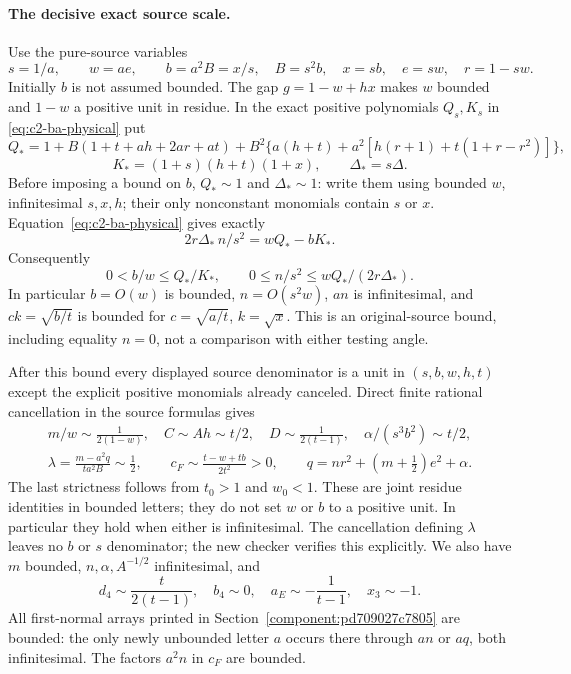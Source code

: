 \paragraph{The decisive exact source scale.}
Use the pure-source variables
\[
 s=1/a,\qquad w=ae,\qquad b=a^2B=x/s,
 \quad B=s^2b,\quad x=sb,\quad e=sw,\quad r=1-sw.
\]
Initially $b$ is not assumed bounded. The gap $g=1-w+hx$ makes $w$
bounded and $1-w$ a positive unit in residue. In the exact positive
polynomials $Q_s,K_s$ in \eqref{eq:c2-ba-physical} put
\[
 Q_*=1+B(1+t+ah+2ar+at)
 +B^2\{a(h+t)+a^2[h(r+1)+t(1+r-r^2)]\},
\]
\[
 K_*=(1+s)(h+t)(1+x),\qquad \Delta_*=s\Delta.
\]
Before imposing a bound on $b$, $Q_*\sim1$ and $\Delta_*\sim1$:
write them using bounded $w$, infinitesimal $s,x,h$; their only
nonconstant monomials contain $s$ or $x$. Equation~\eqref{eq:c2-ba-physical} gives exactly
\[
 \boxed{\quad 2r\Delta_*\,n/s^2=wQ_*-bK_* .\quad}
\tag{R10.2}
\]
Consequently
\[
 0<b/w\le Q_*/K_*,\qquad
 0\le n/s^2\le wQ_*/(2r\Delta_*).
\tag{R10.3}
\]
In particular $b=O(w)$ is bounded, $n=O(s^2w)$, $an$ is
infinitesimal, and $ck=\sqrt{b/t}$ is bounded for
$c=\sqrt{a/t}$, $k=\sqrt{x}$. This is an original-source bound,
including equality $n=0$, not a comparison with either testing angle.

After this bound every displayed source denominator is a unit in
$(s,b,w,h,t)$ except the explicit positive monomials already canceled.
Direct finite rational cancellation in the source formulas gives
\[
 \begin{gathered}
 m/w\sim\frac1{2(1-w)},\quad
 C\sim Ah\sim t/2,\quad D\sim\frac1{2(t-1)},\quad
 \alpha/(s^3b^2)\sim t/2,\\
 \lambda=\frac{m-a^2q}{ta^2B}\sim\frac12,\qquad
 c_F\sim\frac{t-w+tb}{2t^2}>0,\qquad
 q=nr^2+(m+\tfrac12)e^2+\alpha.
 \end{gathered}
\tag{R10.4}
\]
The last strictness follows from $t_0>1$ and $w_0<1$.
These are joint residue identities in bounded letters; they do not
set $w$ or $b$ to a positive unit. In particular they hold when either
is infinitesimal. The cancellation defining $\lambda$ leaves no $b$
or $s$ denominator; the new checker verifies this explicitly.
We also have $m$ bounded, $n,\alpha,A^{-1/2}$ infinitesimal, and
\[
 d_4\sim\frac{t}{2(t-1)},\quad b_4\sim0,\quad
 a_E\sim-\frac1{t-1},\quad x_3\sim-1.
\tag{R10.5}
\]
All first-normal arrays printed in
Section~\ref{component:pd709027c7805} are bounded:
the only newly unbounded letter $a$ occurs there through $an$ or
$aq$, both infinitesimal. The factors $a^2n$ in $c_F$ are bounded.

